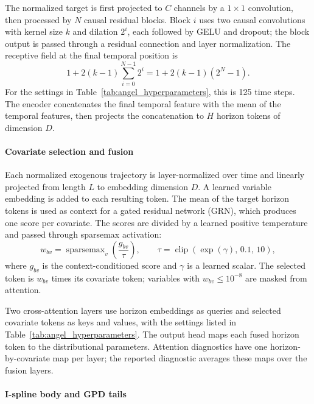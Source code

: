 \documentclass[a4paper,fleqn]{cas-sc}
\begin{document}
The normalized target is first projected to $C$ channels by a $1\times1$
convolution, then processed by $N$ causal residual blocks. Block $i$ uses
two causal convolutions with kernel size $k$ and dilation $2^i$, each
followed by GELU and dropout; the block output is passed through a residual
connection and layer normalization. The receptive field at the final
temporal position is
\begin{equation}
  1 + 2(k-1)\sum_{i=0}^{N-1}2^i
  = 1 + 2(k-1)(2^N-1).
\end{equation}
For the settings in Table~\ref{tab:angel_hyperparameters}, this is 125
time steps. The encoder concatenates the final temporal feature with the
mean of the temporal features, then projects the concatenation to $H$
horizon tokens of dimension $D$.

\paragraph{Covariate selection and fusion}
Each normalized exogenous trajectory is layer-normalized over time and
linearly projected from length $L$ to embedding dimension $D$. A learned variable embedding is added to each resulting token. The mean of the target horizon tokens is used as context for a gated residual network (GRN), which produces
one score per covariate. The scores are divided by a learned positive temperature and passed through sparsemax activation:
\begin{equation}
  w_{bv}
  = \operatorname{sparsemax}_{v}\!\left(
      \frac{g_{bv}}{\tau}
    \right),\qquad
  \tau=\operatorname{clip}\!\left(\exp(\gamma),\,0.1,\,10\right),
\end{equation}
where $g_{bv}$ is the context-conditioned score and $\gamma$ is a learned
scalar. The selected token is $w_{bv}$ times its covariate token; variables
with $w_{bv}\leq 10^{-8}$ are masked from attention. 

Two cross-attention layers use horizon embeddings as queries and selected covariate tokens as keys and values, with the settings listed in Table~\ref{tab:angel_hyperparameters}. The output head maps each fused horizon token to the distributional parameters. Attention diagnostics have one horizon-by-covariate map per layer; the reported diagnostic averages these maps over the fusion layers.

\paragraph{I-spline body and GPD tails}
\end{document}
